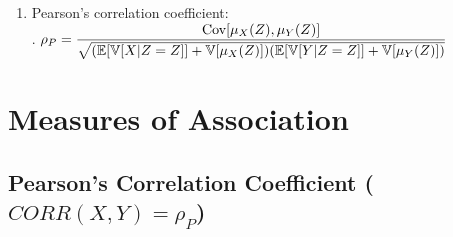 \begin{enumerate}
    \item Pearson’s correlation coefficient:
    \hfill \cite{statistics/book/Statistics-for-Data-Scientists/Maurits-Kaptein}
    \\
    .\hfill
    $
        \rho_P
        = \dfrac{\text{Cov}[\mu_X (Z ), \mu_Y (Z )]}{
            \sqrt{
                (\mathbb{E}[\mathbb{V}[X |Z = Z]] + \mathbb{V}[\mu_X (Z )])
                (\mathbb{E}[\mathbb{V}[Y |Z = Z]] + \mathbb{V}[\mu_Y (Z )])
            }
        }
    $
    \hfill \cite{statistics/book/Statistics-for-Data-Scientists/Maurits-Kaptein}
\end{enumerate}



































\section{Measures of Association}

\subsection{Pearson’s Correlation Coefficient ($CORR(X, Y) = \rho_P$)}

